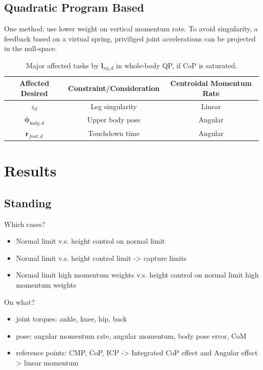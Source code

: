 \subsection{Quadratic Program Based}
One method: use lower weight on vertical momentum rate. To avoid singularity, a feedback based on a virtual spring, priviliged joint accelerations can be projected in the null-space. 

\begin{table}[ht]
\caption{Major affected tasks by $\mathbf{\dot{l}}_{xy,d}$ in whole-body QP, if \ac{CoP} is saturated.} %
\centering %
\begin{tabular}{c c c } %
\hline\hline %
Affected Desired & Constraint/Consideration & Centroidal Momentum Rate \\
\hline %
 $z_d$ & Leg singularity & Linear\\
 $\boldsymbol{\phi}_{body,d}$ & Upper body pose & Angular\\
 $\mathbf{r}_{foot,d}$ &  Touchdown time & Angular\\
\hline %
\end{tabular}
\label{tab:eatqp} %
\end{table}

\newpage
\section{Results}
\subsection{Standing}
Which cases?
\begin{itemize}
	\item Normal limit v.s. height control on normal limit
	\item Normal limit v.s. height control limit -> capture limits
	\item Normal limit high momentum weights v.s. height control on normal limit high momentum weights
\end{itemize}

On what?
\begin{itemize}
	\item joint torques: ankle, knee, hip, back
	\item pose: angular momentum rate, angular momentum, body pose error, CoM
	\item reference points: CMP, CoP, ICP -> Integrated CoP effect and Angular effect > linear momentum
\end{itemize}
